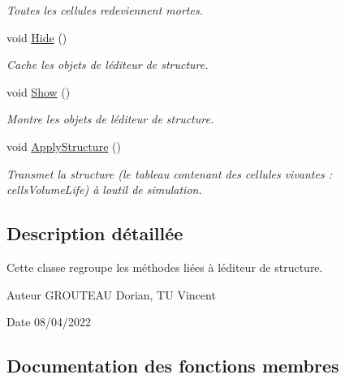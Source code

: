 \begin{DoxyCompactItemize}
\begin{DoxyCompactList}\small\item\em Toutes les cellules redeviennent mortes. \end{DoxyCompactList}\item 
void \mbox{\hyperlink{class_edit_mode_manager_aacc30d9cdb3d747fbad20130903ec24e}{Hide}} ()
\begin{DoxyCompactList}\small\item\em Cache les objets de l\textquotesingle{}éditeur de structure. \end{DoxyCompactList}\item 
void \mbox{\hyperlink{class_edit_mode_manager_acf80baac30f6611bcb1bf97b61ffc1ca}{Show}} ()
\begin{DoxyCompactList}\small\item\em Montre les objets de l\textquotesingle{}éditeur de structure. \end{DoxyCompactList}\item 
void \mbox{\hyperlink{class_edit_mode_manager_ac1d4e4f292d17b4364054f05ddc13bee}{Apply\+Structure}} ()
\begin{DoxyCompactList}\small\item\em Transmet la structure (le tableau contenant des cellules vivantes \+: cells\+Volume\+Life) à l\textquotesingle{}outil de simulation. \end{DoxyCompactList}\end{DoxyCompactItemize}


\subsection{Description détaillée}
Cette classe regroupe les méthodes liées à l\textquotesingle{}éditeur de structure. 

\begin{DoxyAuthor}{Auteur}
G\+R\+O\+U\+T\+E\+AU Dorian, TU Vincent 
\end{DoxyAuthor}
\begin{DoxyDate}{Date}
08/04/2022 
\end{DoxyDate}


\subsection{Documentation des fonctions membres}
\mbox{\label{class_edit_mode_manager_a9f9fbe57f5bbb6b90dc1dc321d411c54}} 
